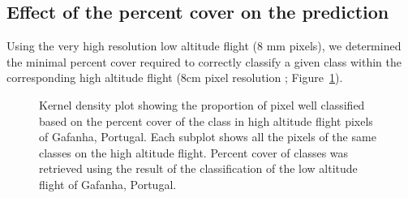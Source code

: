 \documentclass[
  number]{elsarticle}
\begin{document}
\subsection{Effect of the percent cover on the
prediction}\label{effect-of-the-percent-cover-on-the-prediction}

Using the very high resolution low altitude flight (8 mm pixels), we
determined the minimal percent cover required to correctly classify a
given class within the corresponding high altitude flight (8cm pixel
resolution ; Figure~\ref{fig-upscaling}).

\label{cell-fig-upscaling}
\begin{figure}[H]


\caption{\label{fig-upscaling}Kernel density plot showing the proportion
of pixel well classified based on the percent cover of the class in high
altitude flight pixels of Gafanha, Portugal. Each subplot shows all the
pixels of the same classes on the high altitude flight. Percent cover of
classes was retrieved using the result of the classification of the low
altitude flight of Gafanha, Portugal.}

\end{figure}%
\end{document}
